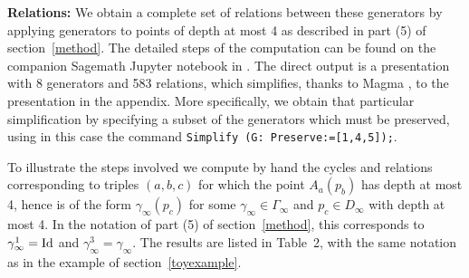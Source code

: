 \documentclass{article}[12pt]
\begin{document}


{\bf Relations:}  We obtain a complete set of relations between these generators by applying generators to points of depth at most 4 as described in part (5) of section~\ref{method}. The detailed steps of the computation can be found on the companion Sagemath Jupyter notebook in \cite{MCode}. The direct output is a presentation with 8 generators and 583 relations, which simplifies, thanks to Magma \cite{Mag}, to the presentation in the appendix. More specifically, we obtain that particular simplification by specifying a subset of the generators which must be preserved, using in this case the command {\tt Simplify (G: Preserve:=[1,4,5]);}.

To illustrate the steps involved we compute by hand the cycles and relations corresponding to triples $(a,b,c)$ for which the point $A_a(p_b)$ has depth at most 4, hence is of the form $\gamma_\infty (p_c)$ for some $\gamma_\infty \in \Gamma_\infty$ and $p_c \in D_\infty$ with depth at most 4. In the notation of part (5) of section~\ref{method}, this corresponds to $\gamma_\infty^1={\rm Id}$ and  $\gamma_\infty^3=\gamma_\infty$. The results are listed in Table~2, with the same notation as in the example of section~\ref{toyexample}.
\end{document}
